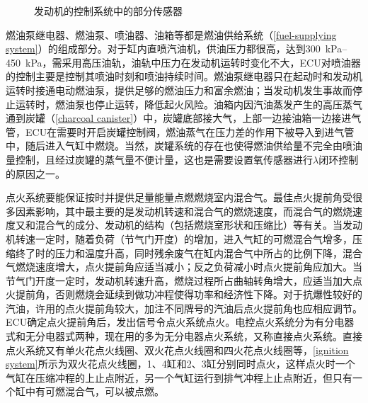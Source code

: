 \documentclass[UTF8]{ctexart}
\numberwithin{figure}{section}
\numberwithin{table}{section}
\begin{document}
\begin{figure}[htbp]
	\centering
	\caption{发动机的控制系统中的部分传感器}
	\label{sensors}
\end{figure}

燃油泵继电器、燃油泵、喷油器、油箱等都是燃油供给系统（\cref{fuel-supplying system}）的组成部分。对于缸内直喷汽油机，供油压力都很高，达到\qtyrange[range-phrase = $\,\sim\,$, range-units = single]{300}{450}{\kPa}，需采用高压油轨，油轨中压力在发动机运转时变化不大，ECU对喷油器的控制主要是控制其喷油时刻和喷油持续时间。燃油泵继电器只在起动时和发动机运转时接通电动燃油泵，提供足够的燃油压力和富余燃油；当发动机发生事故而停止运转时，燃油泵也停止运转，降低起火风险。油箱内因汽油蒸发产生的高压蒸气通到炭罐（\cref{charcoal canister}）中，炭罐底部接大气，上部一边接油箱一边接进气管，ECU在需要时开启炭罐控制阀，燃油蒸气在压力差的作用下被导入到进气管中，随后进入气缸中燃烧。当然，炭罐系统的存在也使得燃油供给量不完全由喷油量控制，且经过炭罐的蒸气量不便计量，这也是需要设置氧传感器进行$\lambda$闭环控制的原因之一。

点火系统要能保证按时并提供足量能量点燃燃烧室内混合气。最佳点火提前角受很多因素影响，其中最主要的是发动机转速和混合气的燃烧速度，而混合气的燃烧速度又和混合气的成分、发动机的结构（包括燃烧室形状和压缩比）等有关。当发动机转速一定时，随着负荷（节气门开度）的增加，进入气缸的可燃混合气增多，压缩终了时的压力和温度升高，同时残余废气在缸内混合气中所占的比例下降，混合气燃烧速度增大，点火提前角应适当减小；反之负荷减小时点火提前角应加大。当节气门开度一定时，发动机转速升高，燃烧过程所占曲轴转角增大，应适当加大点火提前角，否则燃烧会延续到做功冲程使得功率和经济性下降。对于抗爆性较好的汽油，许用的点火提前角较大，加注不同牌号的汽油后点火提前角也应相应调节。ECU确定点火提前角后，发出信号令点火系统点火。电控点火系统分为有分电器式和无分电器式两种，现在用的多为无分电器点火系统，又称直接点火系统。直接点火系统又有单火花点火线圈、双火花点火线圈和四火花点火线圈等，\cref{ignition system}所示为双火花点火线圈，1、4缸和2、3缸分别同时点火，这样点火时一个气缸在压缩冲程的上止点附近，另一个气缸运行到排气冲程上止点附近，但只有一个缸中有可燃混合气，可以被点燃。
\end{document}
